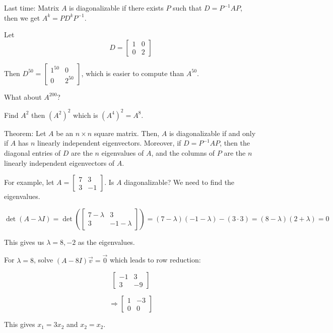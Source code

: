 \documentclass{article}
\begin{document}
Last time: Matrix \( A \) is diagonalizable if there exists \( P \) such that \( D = P^{-1}AP \), then we get \( A^k = PD^kP^{-1} \).

Let \[ D = \begin{bmatrix} 1 & 0 \\ 0 & 2 \end{bmatrix} \]

Then \( D^{50} = \begin{bmatrix} 1^{50} & 0 \\ 0 & 2^{50} \end{bmatrix} \), which is easier to compute than \( A^{50} \).

What about \( A^{200} \)? 

Find \( A^2 \) then \( (A^2)^2 \) which is \( (A^4)^2 = A^8 \).

Theorem: Let \( A \) be an \( n \times n \) square matrix. Then, \( A \) is diagonalizable if and only if \( A \) has \( n \) linearly independent eigenvectors. Moreover, if \( D = P^{-1}AP \), then the diagonal entries of \( D \) are the \( n \) eigenvalues of \( A \), and the columns of \( P \) are the \( n \) linearly independent eigenvectors of \( A \).

For example, let \( A = \begin{bmatrix} 7 & 3 \\ 3 & -1 \end{bmatrix} \). Is \( A \) diagonalizable? We need to find the eigenvalues. 

\[ \det(A - \lambda I) = \det\left(\begin{bmatrix} 7 - \lambda & 3 \\ 3 & -1 - \lambda \end{bmatrix}\right) = (7 - \lambda)(-1 - \lambda) - (3 \cdot 3) = (8 - \lambda)(2 + \lambda) = 0 \]

This gives us \( \lambda = 8, -2 \) as the eigenvalues.

For \( \lambda = 8 \), solve \( (A - 8I) \vec{v} = \vec{0} \) which leads to row reduction: 

\[ \begin{bmatrix} -1 & 3 \\ 3 & -9 \end{bmatrix} \] 

\[ \Rightarrow \begin{bmatrix} 1 & -3 \\ 0 & 0 \end{bmatrix} \]

This gives \( x_1 = 3x_2 \) and \( x_2 = x_2 \). 
\end{document}
